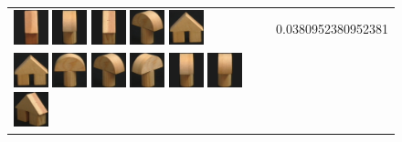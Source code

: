 \begin{figure}[tbp]
\begin{center}
\begin{tabular}{m{11cm} | m{3cm} |}
\includegraphics[width=1cm]{coil/beeld-44.eps} 
\includegraphics[width=1cm]{coil/beeld-2.eps} 
\includegraphics[width=1cm]{coil/beeld-47.eps} 
\includegraphics[width=1cm]{coil/beeld-4.eps} 
\includegraphics[width=1cm]{coil/beeld-42.eps} & {\scriptsize 
0.0380952380952381} \\ \includegraphics[width=1cm]{coil/beeld-42.eps} 
\includegraphics[width=1cm]{coil/beeld-0.eps} 
\includegraphics[width=1cm]{coil/beeld-4.eps} 
\includegraphics[width=1cm]{coil/beeld-3.eps} 
\includegraphics[width=1cm]{coil/beeld-2.eps} 
\includegraphics[width=1cm]{coil/beeld-5.eps} 
\includegraphics[width=1cm]{coil/beeld-46.eps} 

\end{tabular}
\end{center}
\end{figure}
